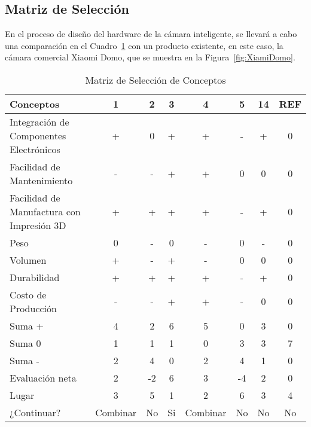 \needspace{3cm}
\subsection{Matriz de Selección}

En el proceso de diseño del hardware de la cámara inteligente, se llevará a cabo una comparación en el Cuadro~\ref{tab:matriz-conceptos} con un producto existente, en este caso, la cámara comercial Xiaomi Domo, que se muestra en la Figura~\ref{fig:XiamiDomo}.

\begin{table}[H]
\centering
\begin{tabularx}{\textwidth}{|X|c|c|c|c|c|c|c|}
\hline
\cellcolor{lightgray}\textbf{Conceptos} & \cellcolor{lightgray}\textbf{1} & \cellcolor{lightgray}\textbf{2} & \cellcolor{lightgray}\textbf{3} & \cellcolor{lightgray}\textbf{4} & \cellcolor{lightgray}\textbf{5} & \cellcolor{lightgray}\textbf{14} & \cellcolor{lightgray}\textbf{REF} \\
\hline
Integración de Componentes Electrónicos & + & 0 & + & + & - & +& 0\\
\hline
Facilidad de Mantenimiento & - & - & + & + & 0 & 0& 0 \\
\hline
Facilidad de Manufactura con Impresión 3D & + & + & + & + & - & +& 0 \\
\hline
Peso & 0 & - & 0 & - & 0 & -& 0 \\
\hline
Volumen & + & - & + & - & 0 & 0& 0 \\
\hline
Durabilidad & + & + & + & + & - & + & 0 \\
\hline
Costo de Producción & - & - & + & + & - & 0 & 0 \\
\hline
\cellcolor{lightgray} Suma +& \cellcolor{lightgray}4 & \cellcolor{lightgray}2 & \cellcolor{lightgray}6 & \cellcolor{lightgray}5 & \cellcolor{lightgray}0 & \cellcolor{lightgray}3 & \cellcolor{lightgray}0 \\
\hline
\cellcolor{lightgray} Suma 0\cellcolor{lightgray}& \cellcolor{lightgray}1 & \cellcolor{lightgray}1 & \cellcolor{lightgray}1 & \cellcolor{lightgray}0 & \cellcolor{lightgray}3 & \cellcolor{lightgray}3 & \cellcolor{lightgray}7 \\
\hline
\cellcolor{lightgray} Suma -& \cellcolor{lightgray}2 & \cellcolor{lightgray}4 & \cellcolor{lightgray}0 & \cellcolor{lightgray}2 & \cellcolor{lightgray}4 & \cellcolor{lightgray}1 & \cellcolor{lightgray}0 \\
\hline
Evaluación neta & 2 & -2 & 6 & 3 & -4 & 2 & 0 \\
\hline
Lugar & 3 & 5 & 1 & 2 & 6 & 3 & 4 \\
\hline
¿Continuar? & Combinar & No & Si & Combinar & No & No & No \\
\hline
\end{tabularx}
\caption{Matriz de Selección de Conceptos}
\label{tab:matriz-conceptos}
\end{table}

